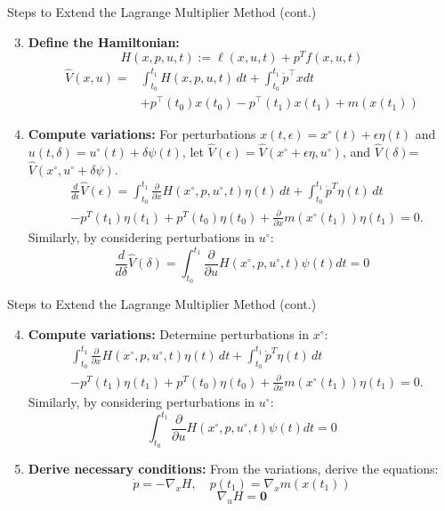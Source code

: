 \documentclass[10pt]{beamer}
\begin{document}
\begin{frame}{Steps to Extend the Lagrange Multiplier Method (cont.)}
  \begin{enumerate}
      \setcounter{enumi}{2}
      \item \textbf{Define the Hamiltonian:}
      \[
      H(x, p, u, t) := \ell(x, u, t) + p^T f(x, u, t)
      \]
      \[
        \begin{aligned}
          \hat{V}(x, u) = &\int_{t_0}^{t_1} H(x, p, u, t) \, dt + \int_{t_0}^{t_1}\dot{p}^{\top}xdt \\ 
          &+ p^{\top}(t_0)x(t_0) - p^{\top}(t_1)x(t_1) + m(x(t_1))
        \end{aligned}
      \]
      \item \textbf{Compute variations:} For perturbations \( x(t, \epsilon) = x^\circ(t) + \epsilon \eta(t) \) and \( u(t, \delta) = u^\circ(t) + \delta \psi(t) \), let \(\hat{V}(\epsilon)=\hat{V}(x^{\circ}+\epsilon \eta,u^{\circ}) \), and \(\hat{V}(\delta)\)=\(\hat{V}(x^{\circ},u^{\circ}+\delta \psi)\).
      \[
      \begin{aligned}
        &\frac{d}{d\epsilon} \hat{V}(\epsilon) = \int_{t_0}^{t_1} \frac{\partial}{\partial x} H(x^\circ, p, u^\circ, t) \eta(t) \, dt + \int_{t_0}^{t_1} \dot{p}^T \eta(t) \, dt \\
        &- p^T(t_1) \eta(t_1) + p^T(t_0) \eta(t_0) + \frac{\partial}{\partial x} m(x^\circ(t_1)) \eta(t_1) = 0.
      \end{aligned}
      \]
      Similarly, by considering perturbations in \( u^{\circ} \):
      \[
         \frac{d}{d\delta} \hat{V}(\delta) =\int_{t_0}^{t_1}\frac{\partial}{\partial u}H(x^{\circ},p,u^{\circ},t)\psi(t)dt=0
      \]
  \end{enumerate}
\end{frame}

\begin{frame}{Steps to Extend the Lagrange Multiplier Method (cont.)}
  \begin{enumerate}
    \setcounter{enumi}{3}
    \item \textbf{Compute variations:} Determine perturbations in \(x^{\circ}\):
    \[
    \begin{aligned}
      &\int_{t_0}^{t_1} \frac{\partial}{\partial x} H(x^\circ, p, u^\circ, t) \eta(t) \, dt + \int_{t_0}^{t_1} \dot{p}^T \eta(t) \, dt \\
      &- p^T(t_1) \eta(t_1) + p^T(t_0) \eta(t_0) + \frac{\partial}{\partial x} m(x^\circ(t_1)) \eta(t_1) = 0.
    \end{aligned}
    \]
    Similarly, by considering perturbations in \( u^{\circ} \):
    \[
       \int_{t_0}^{t_1}\frac{\partial}{\partial u}H(x^{\circ},p,u^{\circ},t)\psi(t)dt=0
    \]
    \item \textbf{Derive necessary conditions:} From the variations, derive the equations:
    \[
    \dot{p} = -\nabla_x H, \quad p(t_1) = \nabla_x m(x(t_1))
    \]
    \[
    \nabla_u H = \mathbf{0}
    \]
\end{enumerate}
\end{frame}
\end{document}

